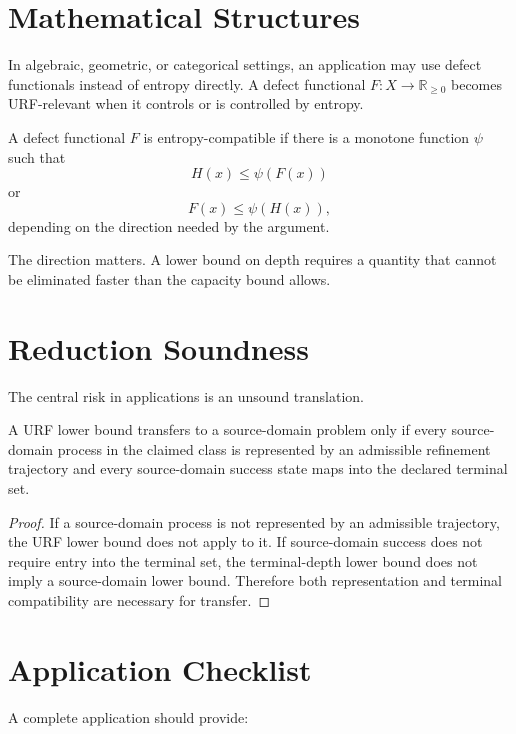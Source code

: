 \section{Mathematical Structures}

In algebraic, geometric, or categorical settings, an application may use
defect functionals instead of entropy directly. A defect functional
\(F:X\to\mathbb R_{\ge 0}\) becomes URF-relevant when it controls or is
controlled by entropy.

\begin{definition}
A defect functional \(F\) is entropy-compatible if there is a monotone function
\(\psi\) such that
\[
H(x)\le \psi(F(x))
\]
or
\[
F(x)\le \psi(H(x)),
\]
depending on the direction needed by the argument.
\end{definition}

The direction matters. A lower bound on depth requires a quantity that cannot
be eliminated faster than the capacity bound allows.

\section{Reduction Soundness}

The central risk in applications is an unsound translation.

\begin{theorem}
A URF lower bound transfers to a source-domain problem only if every
source-domain process in the claimed class is represented by an admissible
refinement trajectory and every source-domain success state maps into the
declared terminal set.
\end{theorem}

\begin{proof}
If a source-domain process is not represented by an admissible trajectory, the
URF lower bound does not apply to it. If source-domain success does not require
entry into the terminal set, the terminal-depth lower bound does not imply a
source-domain lower bound. Therefore both representation and terminal
compatibility are necessary for transfer.
\end{proof}

\section{Application Checklist}

A complete application should provide:


